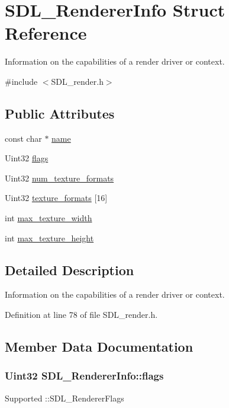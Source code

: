 \hypertarget{structSDL__RendererInfo}{\section{S\+D\+L\+\_\+\+Renderer\+Info Struct Reference}
\label{structSDL__RendererInfo}
}


Information on the capabilities of a render driver or context.  




{\ttfamily \#include $<$S\+D\+L\+\_\+render.\+h$>$}

\subsection*{Public Attributes}
\begin{DoxyCompactItemize}
\item 
const char $\ast$ \hyperlink{structSDL__RendererInfo_a7b37ff58e8310328cc16e3218c56dc4e}{name}
\item 
Uint32 \hyperlink{structSDL__RendererInfo_a95cf0ffd1704fd0a4dd8ceac6c9f0542}{flags}
\item 
Uint32 \hyperlink{structSDL__RendererInfo_acdec165b2053b914313f5996983ec6b8}{num\+\_\+texture\+\_\+formats}
\item 
Uint32 \hyperlink{structSDL__RendererInfo_a16b63b945662da26d2280458bb2bfa01}{texture\+\_\+formats} \mbox{[}16\mbox{]}
\item 
int \hyperlink{structSDL__RendererInfo_a6e6757e3d5c1f0922adaba39380edfa6}{max\+\_\+texture\+\_\+width}
\item 
int \hyperlink{structSDL__RendererInfo_a87c6a13e8d535c2148f8913c05e13102}{max\+\_\+texture\+\_\+height}
\end{DoxyCompactItemize}


\subsection{Detailed Description}
Information on the capabilities of a render driver or context. 

Definition at line 78 of file S\+D\+L\+\_\+render.\+h.



\subsection{Member Data Documentation}
\hypertarget{structSDL__RendererInfo_a95cf0ffd1704fd0a4dd8ceac6c9f0542}{
\subsubsection[{flags}]{\setlength{\rightskip}{0pt plus 5cm}Uint32 S\+D\+L\+\_\+\+Renderer\+Info\+::flags}}\label{structSDL__RendererInfo_a95cf0ffd1704fd0a4dd8ceac6c9f0542}
Supported \+::\+S\+D\+L\+\_\+\+Renderer\+Flags 

